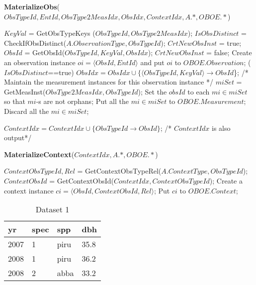\documentclass[10pt]{article}
\begin{document}
\begin{algorithm} [ht]
\caption{{\bf MaterializeObs}($ObsTypeId, EntId, ObsType2MeasIdx, ObsIdx, ContextIdx, A.*, OBOE.*$)}
{\small 
\begin{algorithmic}
    \STATE $KeyVal$ = GetObsTypeKeys ($ObsTypeId, ObsType2MeasIdx$);
    \STATE $IsObsDistinct$ = CheckIfObsDistinct($A.ObservationType, ObsTypeId$);
		\STATE $CrtNewObsInst$ = true;
		\STATE $ObsId$ = GetObsId($ObsTypeId, KeyVal, ObsIdx$);
		  $CrtNewObsInst$ = false;
	\ENDIF
		\STATE Create an observation instance $oi = \langle ObsId,  EntId\rangle$ and put $oi$ to $OBOE.Observation$;
		 ($IsObsDistinct$==true) $ObsIdx = ObsIdx \cup \{\langle ObsTypeId, KeyVal \rangle \rightarrow ObsId$\};
           \ENDIF
    \STATE
    \STATE /* Maintain the measurement instances for this observation instance */
    \STATE $miSet$ = GetMeasInst($ObsType2MeasIdx, ObsTypeId$);
         \STATE Set the $obsId$ to each $mi \in miSet$ so that $mi$-s are not orphans;
	\STATE Put all the $mi \in miSet$ to $OBOE.Measurement$;
    \ELSE
         \STATE Discard all the $mi \in miSet$;
     \ENDIF

	\STATE $ContextIdx = ContextIdx \cup \{ObsTypeId \rightarrow ObsId\}$; /* $ContextIdx$ is also output*/

\end{algorithmic}
}
\end{algorithm}


\begin{algorithm} [htb]
\caption{{\bf MaterializeContext}($ContextIdx, A.*, OBOE.*$)}
{\small 
\begin{algorithmic}
\STATE $ContextObsTypeId, Rel$ = GetContextObsTypeRel($A.ContextType, ObsTypeId$);
	\STATE $ContextObsId$ = GetContextObsId($ContextIdx, ContextObsTypeId$);
	\STATE Create a context instance $ci=\langle ObsId, ContextObsId, Rel\rangle$;
	\STATE Put $ci$ to $OBOE.Context$;
\ENDIF
\ENDFOR
\end{algorithmic}
}
\end{algorithm}

\newpage
\begin{table}[htb]
\begin{center}
\begin{tabular}{|l|l|l|l|}
\hline
yr & spec & spp & dbh\\\hline
2007 & 1 & piru & 35.8 \\\hline
2008 & 1 & piru & 36.2 \\\hline
2008 & 2 & abba & 33.2 \\\hline
\end{tabular}
\end{center}
\vspace{-0.2in}
\caption{Dataset 1}
\label{tb:dataset1}
\end{table}
\end{document}
